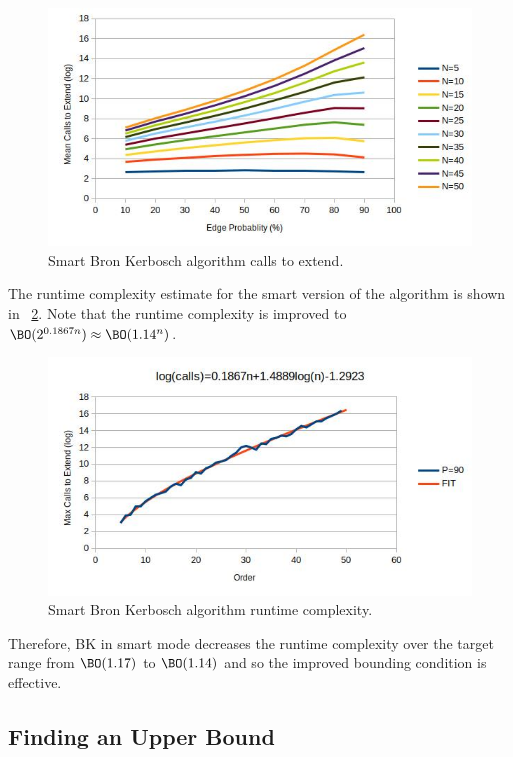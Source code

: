 \begin{figure}[H]
  \centering
  \includegraphics[width=5in]{bron1_calls}
  \caption{Smart Bron Kerbosch algorithm calls to extend.}
  \label{fig:bron2:calls}
\end{figure}

The runtime complexity estimate for the smart version of the algorithm is shown in
\figurename~\ref{fig:bron2:runtime}.  Note that the runtime complexity is improved to
\(\BO(2^{0.1867n})\approx\BO(1.14^n)\).

\begin{figure}[H]
  \centering
  \includegraphics[width=5in]{bron2_runtime}
  \caption{Smart Bron Kerbosch algorithm runtime complexity.}
  \label{fig:bron2:runtime}
\end{figure}

Therefore, BK in smart mode decreases the runtime complexity over the target range from \(\BO(1.17)\) to
\(\BO(1.14)\) and so the improved bounding condition is effective.

\subsection{Finding an Upper Bound}\label{sec:sub:upper}


